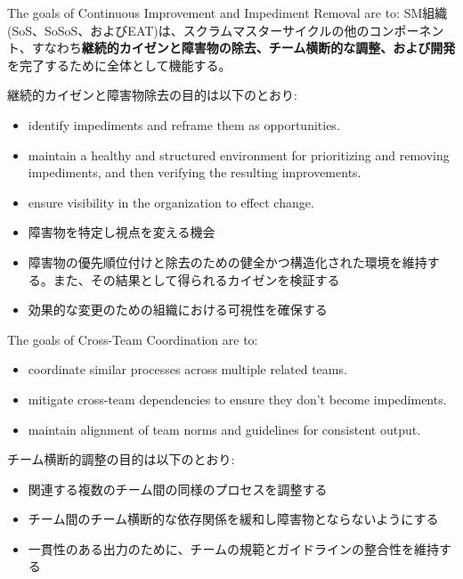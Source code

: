 \documentclass[12pt,a4paper,parskip=full]{scrartcl}
\begin{document}
The goals of Continuous Improvement and Impediment Removal are to:
\fi
SM組織(SoS、SoSoS、およびEAT)は、スクラムマスターサイクルの他のコンポーネント、すなわち\textbf{継続的カイゼンと障害物の除去、チーム横断的な調整、および開発}を完了するために全体として機能する。

継続的カイゼンと障害物除去の目的は以下のとおり:
\begin{itemize}
\item identify impediments and reframe them as opportunities.
\item maintain a healthy and structured environment for prioritizing and
removing impediments, and then verifying the resulting improvements.
\item ensure visibility in the organization to effect change.
\end{itemize}
\fi
\begin{itemize}
\item 障害物を特定し視点を変える機会
\item 障害物の優先順位付けと除去のための健全かつ構造化された環境を維持する。また、その結果として得られるカイゼンを検証する
\item 効果的な変更のための組織における可視性を確保する
\end{itemize}
The goals of Cross-Team Coordination are to:
\begin{itemize}
\item coordinate similar processes across multiple related teams.
\item mitigate cross-team dependencies to ensure they don't become
impediments.
\item maintain alignment of team norms and guidelines for consistent output.
\end{itemize}
\fi
チーム横断的調整の目的は以下のとおり:
\begin{itemize}
\item 関連する複数のチーム間の同様のプロセスを調整する
\item チーム間のチーム横断的な依存関係を緩和し障害物とならないようにする
\item 一貫性のある出力のために、チームの規範とガイドラインの整合性を維持する
\end{itemize}
\end{document}
